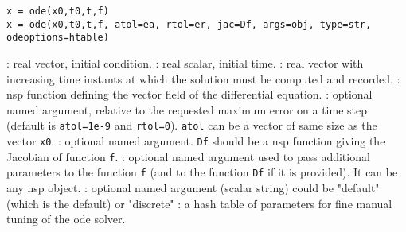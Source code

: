 
\begin{mandesc}
\end{mandesc}

\begin{calling_sequence}
\begin{verbatim}
x = ode(x0,t0,t,f)
x = ode(x0,t0,t,f, atol=ea, rtol=er, jac=Df, args=obj, type=str, odeoptions=htable)
\end{verbatim}
\end{calling_sequence}
\begin{parameters}
  \begin{varlist}
    : real vector, initial condition.
    : real scalar, initial time.
    : real vector with increasing time instants at which the solution must be computed and recorded.
    : nsp function defining the vector field of the differential equation.
    : optional named argument, relative to the requested maximum error on a time step 
    (default is \verb+atol=1e-9+ and \verb+rtol=0+). \verb+atol+ can be a vector of same size as 
    the vector \verb+x0+.
    : optional named argument. \verb+Df+ should be a nsp function giving the Jacobian of function \verb+f+.
    : optional named argument used to pass additional parameters to the function \verb+f+ 
    (and to the function \verb+Df+ if it is provided). It can be any nsp object.
    : optional named argument (scalar string) could be "default" (which is the default) or "discrete"
    : a hash table of parameters for fine manual tuning of the ode solver.
  \end{varlist}
\end{parameters}

